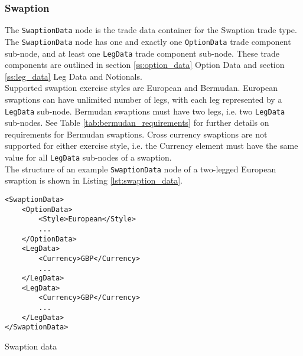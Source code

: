 \subsubsection{Swaption}

The \lstinline!SwaptionData!  node is the trade data container for the Swaption trade type. The \lstinline!SwaptionData!
node has one and exactly one \lstinline!OptionData! trade component sub-node, and at least one \lstinline!LegData! trade
component sub-node.  These trade components are outlined in section \ref{ss:option_data} Option Data and section
\ref{ss:leg_data} Leg Data and Notionals.\\

Supported swaption exercise styles are European and Bermudan. European swaptions can have unlimited number of legs, with
each leg represented by a \lstinline!LegData! sub-node. Bermudan swaptions must have two legs, i.e. two
\lstinline!LegData! sub-nodes. See Table \ref{tab:bermudan_requirements} for further details on requirements for
Bermudan swaptions. Cross currency swaptions are not supported for either exercise style, i.e. the Currency element must
have the same value for all \lstinline!LegData! sub-nodes of a swaption.\\

The structure of an example \lstinline!SwaptionData!  node of a two-legged European swaption is shown in Listing
\ref{lst:swaption_data}.

\begin{listing}[H]
\begin{verbatim}
<SwaptionData>
    <OptionData>
        <Style>European</Style>
        ...
    </OptionData>
    <LegData>
        <Currency>GBP</Currency>
        ...
    </LegData>
    <LegData>
        <Currency>GBP</Currency>
        ...
    </LegData>
</SwaptionData>
\end{verbatim}
\caption{Swaption data}
\label{lst:swaption_data}
\end{listing}

